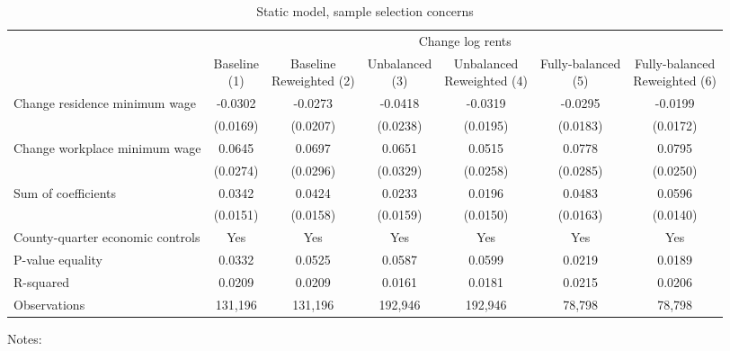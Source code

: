 \begin{table}
    \caption{Static model, sample selection concerns}
    \label{tab:static_sample}

    \begin{tabular}{@{}lcccccc@{}}
        \toprule
                                                        & \multicolumn{6}{c}{Change log rents}                                     \\ \cmidrule(l){2-7} 
                                                        & \shortsack{Baseline\\(1)}       & \shortsack{Baseline\\Reweighted (2)}
                                                        & \shortsack{Unbalanced\\(3)}     & \shortsack{Unbalanced\\Reweighted (4)}
                                                        & \shortsack{Fully-balanced\\(5)} & \shortsack{Fully-balanced\\Reweighted (6)}  \\ \midrule
        Change residence minimum wage                   & -0.0302      & -0.0273        & -0.0418       & -0.0319      & -0.0295     & -0.0199            \\
                                                        & (0.0169)    & (0.0207)      & (0.0238)     & (0.0195)    & (0.0183)   & (0.0172)          \\
        Change workplace minimum wage                   & 0.0645      & 0.0697        & 0.0651       & 0.0515      & 0.0778     & 0.0795            \\
                                                        & (0.0274)    & (0.0296)      & (0.0329)     & (0.0258)    & (0.0285)   & (0.0250)          \\ \midrule
        Sum of coefficients                             & 0.0342      & 0.0424        & 0.0233       & 0.0196      & 0.0483     &  0.0596           \\
                                                        & (0.0151)    & (0.0158)      & (0.0159)     & (0.0150)    & (0.0163)   & (0.0140)          \\ \midrule
        County-quarter economic controls                & Yes      & Yes        & Yes       & Yes      & Yes     & Yes            \\
        P-value equality                                & 0.0332      & 0.0525        & 0.0587       & 0.0599      & 0.0219     & 0.0189            \\
        R-squared                                       & 0.0209      & 0.0209        & 0.0161       & 0.0181      & 0.0215     & 0.0206            \\
        Observations                                    & 131,196     & 131,196       & 192,946      & 192,946     & 78,798    & 78,798           \\ \bottomrule
    \end{tabular}

    \begin{minipage}{.95\textwidth} \footnotesize
        \vspace{2mm}
        Notes: 
    \end{minipage}
\end{table}
